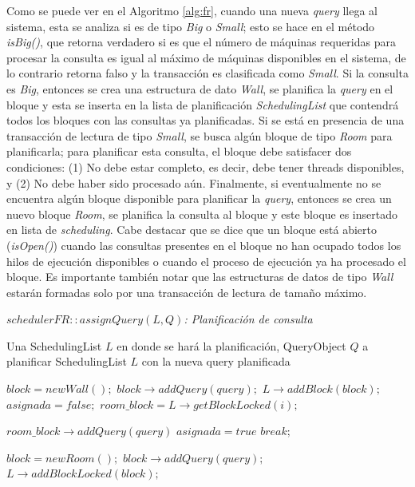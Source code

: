 Como se puede ver en el Algoritmo \ref{alg:fr}, cuando una nueva \textit{query} llega al sistema, esta se analiza si es de tipo \textit{Big} o \textit{Small}; esto se hace en el método \textit{isBig()}, que retorna verdadero si es que el número de máquinas requeridas para procesar la consulta es igual al máximo de máquinas disponibles en el sistema, de lo contrario retorna falso y la transacción es clasificada como \textit{Small}. Si la consulta es \textit{Big}, entonces se crea una estructura de dato \textit{Wall}, se planifica la \textit{query} en el bloque y esta se inserta en la lista de planificación \textit{SchedulingList} que contendrá todos los bloques con las consultas ya planificadas. Si se está en presencia de una transacción de lectura de tipo \textit{Small}, se busca algún bloque de tipo \textit{Room} para planificarla; para planificar esta consulta, el bloque debe satisfacer dos condiciones: (1) No debe estar completo, es decir, debe tener threads disponibles, y (2) No debe haber sido procesado aún. Finalmente, si eventualmente no se encuentra algún bloque disponible para planificar la \textit{query}, entonces se crea un nuevo bloque \textit{Room}, se planifica la consulta al bloque y este bloque es insertado en lista de \textit{scheduling}. Cabe destacar que se dice que un bloque está abierto (\textit{isOpen()}) cuando las consultas presentes en el bloque no han ocupado todos los hilos de ejecución disponibles o cuando el proceso de ejecución ya ha procesado el bloque. Es importante también notar que las estructuras de datos de tipo \textit{Wall} estarán formadas solo por una transacción de lectura de tamaño máximo.

\begin{algorithm}[!th]
\caption{\em $schedulerFR::assignQuery(L, Q)$: Planificación de consulta}
\label{alg:fr}
\begin{algorithmic}[1]
\REQUIRE Una SchedulingList $L$ en donde se hará la planificación, QueryObject $Q$ a planificar
\ENSURE SchedulingList $L$ con la nueva query planificada

	\STATE $block = new Wall();$
	\STATE $block \rightarrow addQuery(query);$
	\STATE $L \rightarrow addBlock(block);$
\ELSE
	\STATE $asignada = false;$
		\STATE $room\_block = L \rightarrow getBlockLocked(i);$
		
			\STATE $room\_block \rightarrow addQuery(query)$
			\STATE $asignada = true$
			\STATE $break;$
		\ENDIF
	\ENDFOR
	
		\STATE $block = new Room();$
		\STATE $block \rightarrow addQuery(query);$
		\STATE $L \rightarrow addBlockLocked(block);$		
	\ENDIF
\ENDIF

\end{algorithmic}
\end{algorithm}

